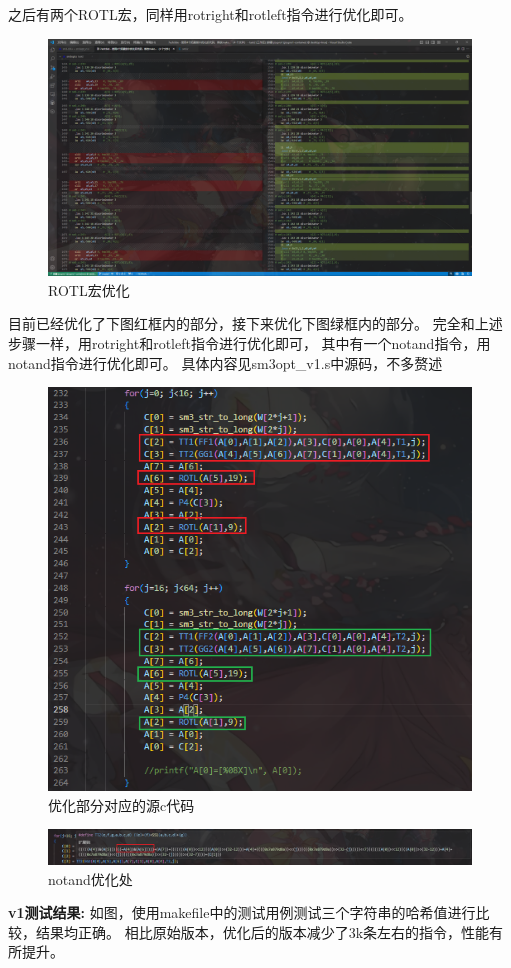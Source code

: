 \documentclass[12pt,hyperref,a4paper,UTF8]{ctexart}
\begin{document}
    之后有两个ROTL宏，同样用rotright和rotleft指令进行优化即可。
  \begin{figure}[H]
      \centering
      \includegraphics[width =1.0\textwidth]{figures/fig/image18.png}
      \caption{ROTL宏优化}
  \end{figure}

  目前已经优化了下图红框内的部分，接下来优化下图绿框内的部分。
  完全和上述步骤一样，用rotright和rotleft指令进行优化即可，
  其中有一个notand指令，用notand指令进行优化即可。
  具体内容见sm3opt\_v1.s中源码，不多赘述
  \begin{figure}[H]
      \centering
      \includegraphics[width =1.0\textwidth]{figures/fig/image19.png}
      \caption{优化部分对应的源c代码}
  \end{figure}
  \begin{figure}[H]
      \centering
      \includegraphics[width =1.0\textwidth]{figures/fig/image20.png}
      \caption{notand优化处}
  \end{figure}
\newpage
\textbf{v1测试结果:}
  如图，使用makefile中的测试用例测试三个字符串的哈希值进行比较，结果均正确。
相比原始版本，优化后的版本减少了3k条左右的指令，性能有所提升。
\end{document}
